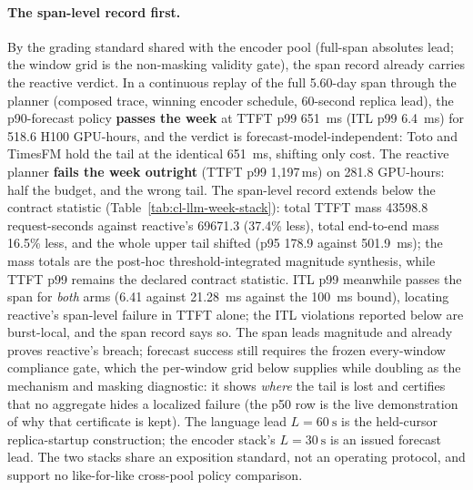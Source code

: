 \paragraph{The span-level record first.} By the grading standard shared
with the encoder pool (full-span absolutes lead; the window grid is the
non-masking validity gate), the span record already carries the reactive
verdict. In a continuous replay of the full 5.60-day span
through the planner (composed trace, winning encoder schedule, 60-second
replica lead), the p90-forecast policy \textbf{passes the week} at TTFT
p99 \SI{651}{\milli\second} (ITL p99 \SI{6.4}{\milli\second}) for 518.6
H100 GPU-hours, and the verdict is forecast-model-independent: Toto and
TimesFM hold the tail at the identical \SI{651}{\milli\second}, shifting
only cost. The reactive planner
\textbf{fails the week outright} (TTFT p99 1{,}197\,\si{\milli\second}) on
281.8 GPU-hours: half the budget, and the wrong tail. The span-level
record extends below the contract statistic
(Table~\ref{tab:cl-llm-week-stack}): total TTFT mass \num{43598.8}
request-seconds against reactive's \num{69671.3} (37.4\% less),
total end-to-end mass 16.5\% less, and the whole upper tail
shifted (p95 \num{178.9} against \num{501.9}~ms); the mass totals are the
post-hoc threshold-integrated magnitude synthesis, while TTFT p99 remains
the declared contract statistic. ITL p99 meanwhile passes
the span for \emph{both} arms (6.41 against 21.28~ms against the
\SI{100}{\milli\second} bound), locating reactive's span-level failure in
TTFT alone; the ITL violations reported below are burst-local, and the
span record says so. The span leads magnitude and already proves
reactive's breach; forecast success still requires the frozen every-window
compliance gate, which the per-window grid below supplies while doubling
as the mechanism and masking diagnostic: it shows \emph{where} the tail is
lost and certifies that no aggregate hides a localized failure (the p50
row is the live demonstration of why that certificate is kept). The
language lead $L{=}\SI{60}{\second}$ is the held-cursor replica-startup
construction; the encoder stack's $L{=}\SI{30}{\second}$ is an issued
forecast lead. The two stacks share an exposition standard, not an
operating protocol, and support no like-for-like cross-pool policy
comparison.

